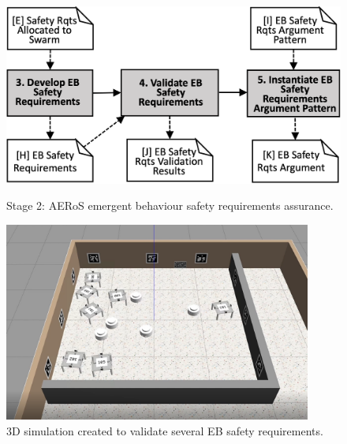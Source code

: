 \documentclass[runningheads]{llncs}
\begin{document}
\vspace{-4ex}
\begin{figure}
	\centering
	\begin{minipage}{.55\textwidth}
		\centering
		\includegraphics[trim={0mm -6mm 0mm -6mm},clip,width=\textwidth]{figures/amlas-a-stage2-v3.png}
		\vspace{-2ex}
		\caption{Stage 2: AERoS emergent behaviour safety requirements assurance.}%
	\label{amlas-a-stage2}
\end{minipage}%
\begin{minipage}{.45\textwidth}
	\centering
	\includegraphics[trim={30mm 25mm 45mm 30mm},clip,width=0.9\textwidth]{figures/3Dsim.png}
	\vspace{-2ex}
	\caption{3D simulation created to validate several EB safety requirements.}
	\label{3Dsim}
\end{minipage}
\vspace{-4ex}
\end{figure}
\end{document}
